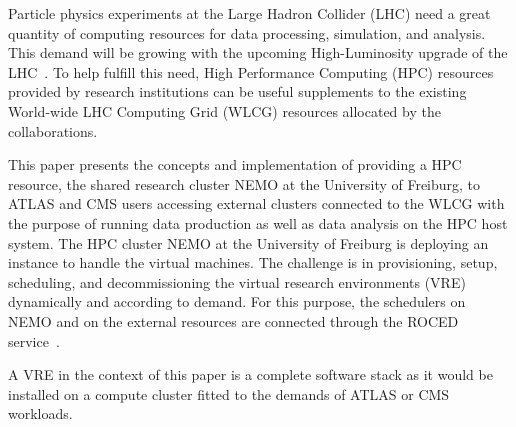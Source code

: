 
Particle physics experiments at the Large Hadron Collider (LHC) need a
great quantity of computing resources for data processing, simulation, and analysis.
This demand will be growing with the upcoming High-Luminosity upgrade of the LHC~\cite{HLLHCcompneeds}.
To help fulfill this need, High Performance Computing (HPC) resources provided by research institutions
can be useful supplements to the existing World-wide LHC Computing
Grid (WLCG) resources
allocated by the collaborations.


This paper presents the concepts and implementation of providing a HPC resource, the
shared research cluster NEMO at the University of Freiburg, to ATLAS and CMS users accessing external clusters connected to the WLCG with the purpose of running data production as well as
data analysis on the HPC host system. The HPC cluster NEMO at
the University of Freiburg is deploying an \Openstack~\cite{Openstack} instance to handle the
virtual machines. The challenge is in provisioning, setup, scheduling, and decommissioning the virtual research environments (VRE) dynamically and according to demand. For this purpose, the schedulers on NEMO and on the external resources are
connected through the ROCED service~\cite{ROCED}.

A VRE in the context of this paper is a complete software stack
as it would be installed on a compute cluster fitted to the demands of ATLAS or CMS workloads.

